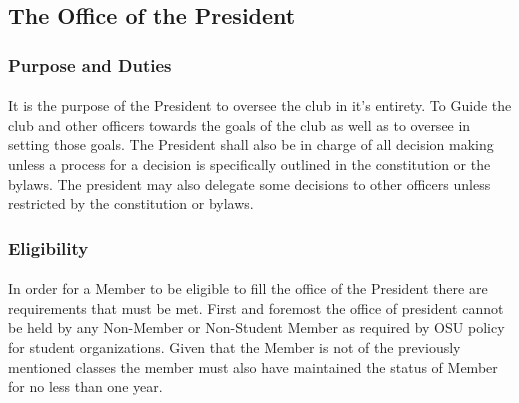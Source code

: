 \documentclass[12pt]{article}
\begin{document}

\subsection{The Office of the President}
\subsubsection{Purpose and Duties}
\paragraph{}
It is the purpose of the President to oversee the club in it's entirety. To Guide the club and other officers towards the goals of the club as well as to oversee in setting those goals. The President shall
also be in charge of all decision making unless a process for a decision is specifically outlined in the constitution or the bylaws. The president may also delegate some decisions to other officers unless
restricted by the constitution or bylaws.
\subsubsection{Eligibility}
\paragraph{}
In order for a Member to be eligible to fill the office of the President there are requirements that must be met. First and foremost the office of president cannot be held by any Non-Member or Non-Student Member as required by OSU policy for student organizations. Given that the Member is not of the previously mentioned classes the member must also have maintained the status of Member for no less than one year. 
\end{document}
